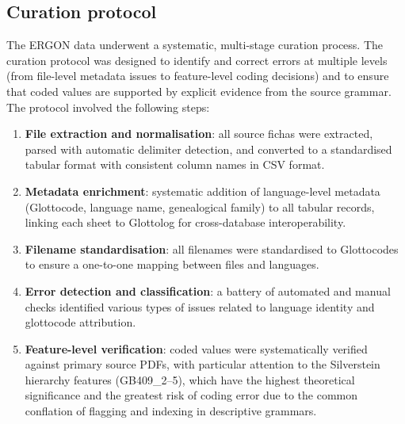 \documentclass[12pt,a4paper]{article}
\begin{document}
\subsection{Curation protocol}

The ERGON data underwent a systematic, multi-stage curation process. The curation protocol was designed to identify and correct errors at multiple levels (from file-level metadata issues to feature-level coding decisions) and to ensure that coded values are supported by explicit evidence from the source grammar. The protocol involved the following steps:

\begin{enumerate}
\item \textbf{File extraction and normalisation}: all source fichas were extracted, parsed with automatic delimiter detection, and converted to a standardised tabular format with consistent column names in CSV format.

\item \textbf{Metadata enrichment}: systematic addition of language-level metadata (Glottocode, language name, genealogical family) to all tabular records, linking each sheet to Glottolog for cross-database interoperability.

\item \textbf{Filename standardisation}: all filenames were standardised to Glottocodes to ensure a one-to-one mapping between files and languages.

\item \textbf{Error detection and classification}: a battery of automated and manual checks identified various types of issues related to language identity and glottocode attribution.

\item \textbf{Feature-level verification}: coded values were systematically verified against primary source PDFs, with particular attention to the Silverstein hierarchy features (GB409\_2--5), which have the highest theoretical significance and the greatest risk of coding error due to the common conflation of flagging and indexing in descriptive grammars.


\end{enumerate}
\end{document}
